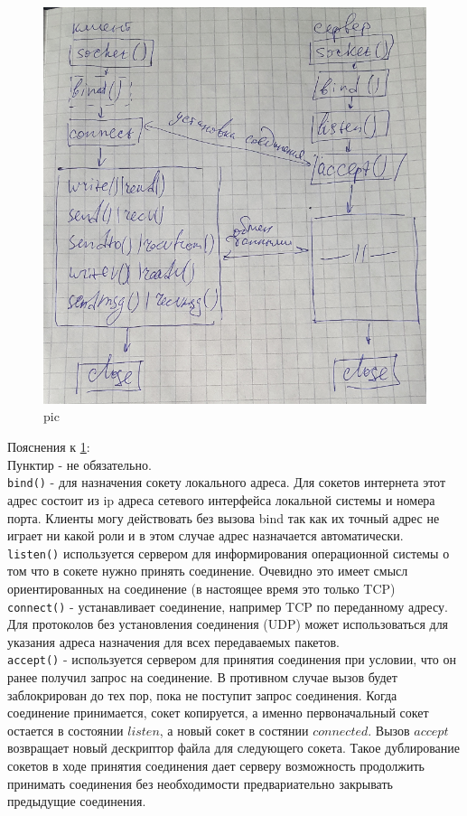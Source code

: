 \begin{figure}[H]
  \centering
  \includegraphics[width=\textwidth]{pic/2.png}
  \caption{pic}
  \label{pic_alhoritm_cs}
\end{figure}

Пояснения к \ref{pic_alhoritm_cs}:\\
Пунктир - не обязательно.\\
\verb|bind()| - для назначения сокету локального адреса. Для сокетов интернета этот адрес состоит из ip адреса сетевого интерфейса локальной системы и номера порта. Клиенты могу действовать без вызова bind так как их точный адрес не играет ни какой роли и в этом случае адрес назначается автоматически.\\
\verb|listen()| используется сервером для информирования операционной системы о том что в сокете нужно принять соединение. Очевидно это имеет смысл ориентированных на соединение (в настоящее время это только TCP)\\
\verb|connect()| - устанавливает соединение, например TCP по переданному адресу. Для протоколов без установления соединения (UDP) может использоваться для указания адреса назначения для всех передаваемых пакетов.\\
\verb|accept()| - используется сервером для принятия соединения при условии, что он ранее получил запрос на соединение. В противном случае вызов будет заблокрирован до тех пор, пока не поступит запрос соединения. Когда соединение принимается, сокет копируется, а именно первоначальный сокет остается в состоянии $listen$, а новый сокет в состянии $connected$.  Вызов $accept$ возвращает новый дескриптор файла для следующего сокета. Такое дублирование сокетов в ходе принятия соединения дает серверу возможность продолжить принимать соединения без необходимости предвариательно закрывать предыдущие соединения.

